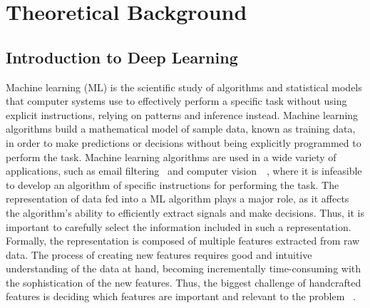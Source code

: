 \chapter{Theoretical Background}
\section{Introduction to Deep Learning}
\vspace{1em}
Machine learning (ML) is the scientific study of algorithms and statistical models that computer systems use to effectively perform a specific task without using explicit instructions, relying on patterns and inference instead. Machine learning algorithms build a mathematical model of sample data, known as training data, in order to make predictions or decisions without being explicitly programmed to perform the task. Machine learning algorithms are used in a wide variety of applications, such as email filtering~\cite{email_filter} and computer vision~\cite{computer_vision}~\cite{microsoft_computer_vision}, where it is infeasible to develop an algorithm of specific instructions for performing the task. The representation of data fed into a ML algorithm plays a major role, as it affects the algorithm’s ability to efficiently extract signals and make decisions. Thus, it is important to carefully select the information included in such a representation. Formally, the representation is composed of multiple features extracted from raw data. The process of creating new features requires good and intuitive understanding of the data at hand, becoming incrementally time-consuming with the sophistication of the new features. Thus, the biggest challenge of handcrafted features is deciding which features are important and relevant to the problem ~\cite{Goodfellow-et-al-2016}.
\par

